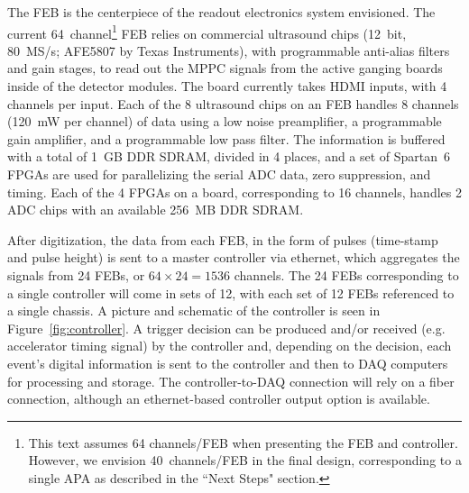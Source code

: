 The FEB is the centerpiece of the readout electronics system envisioned. The current 64~channel\footnote{This text assumes 64 channels/FEB when presenting the FEB and controller. However, we envision 40~channels/FEB in the final design, corresponding to a single APA as described in the ``Next Steps" section.} FEB relies on commercial ultrasound chips (12~bit, 80~MS/s; AFE5807 by Texas Instruments), with programmable anti-alias filters and gain stages, to read out the MPPC signals from the active ganging boards inside of the detector modules. The board currently takes HDMI inputs, with 4 channels per input.  Each of the 8 ultrasound chips on an FEB handles 8 channels (120~mW per channel) of data using a low noise preamplifier, a programmable gain amplifier, and a programmable low pass filter. The information is buffered with a total of 1~GB DDR SDRAM, divided in 4 places, and a set of Spartan~6 FPGAs are used for parallelizing the serial ADC data, zero suppression, and timing. Each of the 4 FPGAs on a board, corresponding to 16 channels, handles 2 ADC chips with an available 256~MB DDR SDRAM. 

After digitization, the data from each FEB, in the form of pulses (time-stamp and pulse height) is sent to a master controller via ethernet, which aggregates the signals from 24 FEBs, or $64 \times 24=1536$ channels. The 24 FEBs corresponding to a single controller will come in sets of 12, with each set of 12 FEBs referenced to a single chassis. A picture and schematic of the controller is seen in Figure~\ref{fig:controller}. A trigger decision can be produced and/or received (e.g. accelerator timing signal) by the controller and, depending on the decision, each event's digital information is sent to the controller and then to DAQ computers for processing and storage. The controller-to-DAQ connection will rely on a fiber connection, although an ethernet-based controller output option is available.


 

